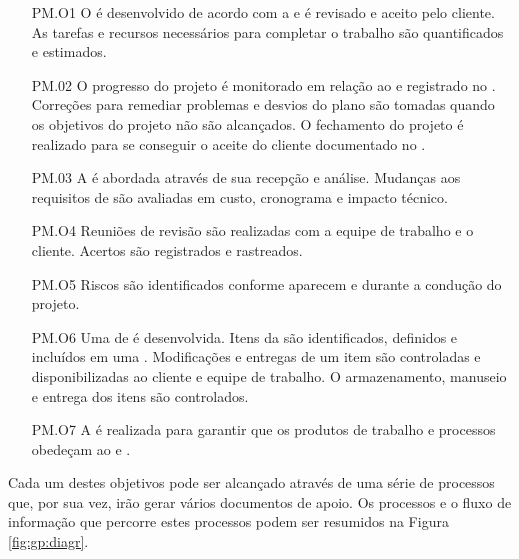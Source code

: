 \begin{itemize}

\item[PM.O1] O \ppj é desenvolvido de acordo com a \dt e é revisado e aceito pelo cliente. As tarefas e recursos necessários para completar o trabalho são quantificados e estimados.

\item[PM.02] O progresso do projeto é monitorado em relação ao \ppj e registrado no \prog. Correções para remediar problemas e desvios do plano são tomadas quando os objetivos do projeto não são alcançados. O fechamento do projeto é realizado para se conseguir o aceite do cliente documentado no \aceite.

\item[PM.03] A \muda é abordada através de sua recepção e análise. Mudanças aos requisitos de \sw são avaliadas em custo, cronograma e impacto técnico.

\item[PM.O4] Reuniões de revisão são realizadas com a equipe de trabalho e o cliente. Acertos são registrados e rastreados.

\item[PM.O5] Riscos são identificados conforme aparecem e durante a condução do projeto.

\item[PM.O6] Uma \vcs de \sw é desenvolvida. Itens da \swcfg são identificados, definidos e incluídos em uma \bline. Modificações e entregas de um item são controladas e disponibilizadas ao cliente e equipe de trabalho. O armazenamento, manuseio e entrega dos itens são controlados.

\item[PM.O7] A \qsw é realizada para garantir que os produtos de trabalho e processos obedeçam ao \ppj e \req.

\end{itemize}

Cada um destes objetivos pode ser alcançado através de uma série de processos que, por sua vez, irão gerar vários documentos de apoio. Os processos e o fluxo de informação que percorre estes processos podem ser resumidos na Figura \ref{fig:gp:diagr}.

